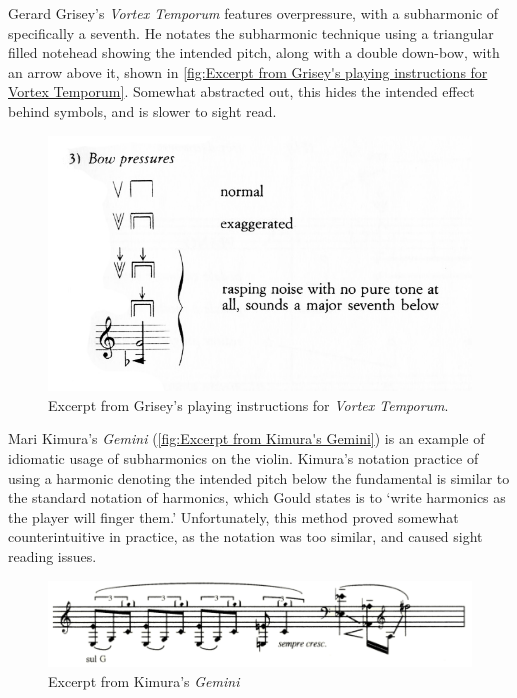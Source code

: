 Gerard Grisey's \emph{Vortex Temporum} features overpressure, with a subharmonic of specifically a seventh.\autocite[]{griseyVortexTemporum}
He notates the subharmonic technique using a triangular filled notehead showing the intended pitch, along with a double down-bow, with an arrow above it, shown in \autoref{fig:Excerpt from Grisey's playing instructions for Vortex Temporum}. 
Somewhat abstracted out, this hides the intended effect behind symbols, and is slower to sight read.


\begin{figure}
  \includegraphics[width=\linewidth]{./resources/griseyVortexTemporum.jpg}
  \caption{Excerpt from Grisey's playing instructions for \emph{Vortex Temporum}.}
\label{fig:Excerpt from Grisey's playing instructions for Vortex Temporum}
\end{figure}


Mari Kimura's \emph{Gemini} (\autoref{fig:Excerpt from Kimura's Gemini}) is an example of idiomatic usage of subharmonics on the violin.\autocite[]{kimuraGemini1992}
Kimura's notation practice of using a harmonic denoting the intended pitch below the fundamental is similar to the standard notation of harmonics, which Gould states is to `write harmonics as the player will finger them.'\autocite[413]{gouldBars2011} 
Unfortunately, this method proved somewhat counterintuitive in practice, as the notation was too similar, and caused sight reading issues.\autocite[]{appleseedFeedbackExploratorySession2019}

  
\begin{figure}
  \includegraphics[width=\linewidth]{./resources/kimura_gemini.png}
  \caption{Excerpt from Kimura's \emph{Gemini}}\label{fig:Excerpt from Kimura's Gemini}
\end{figure}

